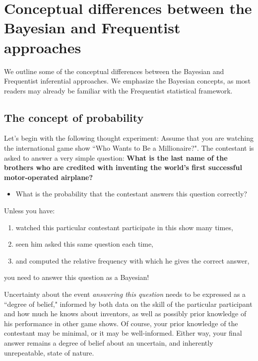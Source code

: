 \chapter{Conceptual differences between the Bayesian and Frequentist approaches}\label{chap2}

We outline some of the conceptual differences between the Bayesian and Frequentist inferential approaches. We emphasize the Bayesian concepts, as most readers may already be familiar with the Frequentist statistical framework.

\section{The concept of probability}\label{sec21}

Let's begin with the following thought experiment: Assume that you are watching the international game show ``Who Wants to Be a Millionaire?". The contestant is asked to answer a very simple question: \textbf{What is the last name of the brothers who are credited with inventing the world's first successful motor-operated airplane?}

\begin{itemize}
	\item What is the probability that the contestant answers this question correctly? 
\end{itemize}

Unless you have: 

\begin{enumerate}
	\item watched this particular contestant participate in this show many times,
	\item seen him asked this same question each time, 
	\item and computed the relative frequency with which he gives the correct answer,   
\end{enumerate}

you need to answer this question as a Bayesian!

Uncertainty about the event \textit{answering this question} needs to be expressed as a ``degree of belief," informed by both data on the skill of the particular participant and how much he knows about inventors, as well as possibly prior knowledge of his performance in other game shows. Of course, your prior knowledge of the contestant may be minimal, or it may be well-informed. Either way, your final answer remains a degree of belief about an uncertain, and inherently unrepeatable, state of nature.


